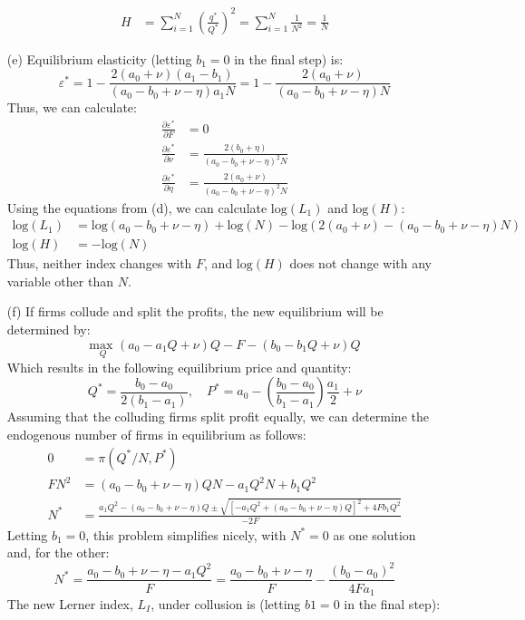\documentclass{article}
\newcommand{\loge}[1]{\text{log}\left(#1\right)}
\newcommand{\usmax}[1]{\underset{#1}{\text{max }}}
\newcommand{\pl}{\partial}
\begin{document}
\begin{itemize}
\begin{align*}
      H &= \sum_{i=1}^N\left(\frac{q^*}{Q^*}\right)^2 = \sum_{i=1}^N\frac{1}{N^2} = \frac{1}{N}
    \end{align*} 
    \item[(e)] Equilibrium elasticity (letting ${b_1=0}$ in the final step) is: \[
      \varepsilon^* = 1-\frac{2(a_0+\nu)(a_1-b_1)}{(a_0-b_0+\nu-\eta)a_1N}
      = 1 - \frac{2(a_0+\nu)}{(a_0-b_0+\nu-\eta)N}
    \]
    Thus, we can calculate:\begin{align*}
      \frac{\pl\varepsilon^*}{\pl F}    &= 0                                        \\
      \frac{\pl\varepsilon^*}{\pl \nu}  &= \frac{2(b_0+\eta)}{(a_0-b_0+\nu-\eta)^2N} \\
      \frac{\pl\varepsilon^*}{\pl \eta} &= \frac{2(a_0+\nu)}{(a_0-b_0+\nu-\eta)^2N} 
    \end{align*}
    Using the equations from (d), we can calculate $\loge{L_1}$ and $\loge{H}$:\begin{align*}
      \loge{L_1}  &= \loge{a_0-b_0+\nu-\eta} + \loge{N} - \loge{2(a_0+\nu)-(a_0-b_0+\nu-\eta)N} \\
      \loge{H}    &= -\loge{N}
    \end{align*}
    Thus, neither index changes with $F$, and $\loge{H}$ does not change with any variable other than $N$.
    \item[(f)] If firms collude and split the profits, the new equilibrium will be determined by: \[
      \usmax{Q}(a_0-a_1Q+\nu)Q - F - (b_0-b_1Q + \nu)Q
    \]
    Which results in the following equilibrium price and quantity:\[
      Q^* = \frac{b_0-a_0}{2(b_1-a_1)},\quad P^* = a_0 - \left(\frac{b_0-a_0}{b_1-a_1}\right)\frac{a_1}{2} + \nu
    \]
    Assuming that the colluding firms split profit equally, we can determine the endogenous number of firms in equilibrium as follows:\begin{align*}
      0 &= \pi(Q^*/N,P^*)                                    \\
      FN^2 &= (a_0 - b_0 + \nu - \eta)QN - a_1Q^2N + b_1Q^2 \\
      N^* &= \frac{a_1Q^2-(a_0-b_0+\nu-\eta)Q\pm\sqrt{[-a_1Q^2+(a_0-b_0+\nu-\eta)Q]^2+4Fb_1Q^2}}{-2F}
    \end{align*}
    Letting ${b_1=0}$, this problem simplifies nicely, with $N^*=0$ as one solution and, for the other:\[
      N^* = \frac{a_0 - b_0 + \nu - \eta - a_1Q^2}{F} 
          = \frac{a_0 - b_0 + \nu - \eta}{F} - \frac{(b_0-a_0)^2}{4Fa_1}
    \]
    The new Lerner index, $L_I$, under collusion is (letting ${b1=0}$ in the final step):\[
\]
\end{itemize}
\end{document}
